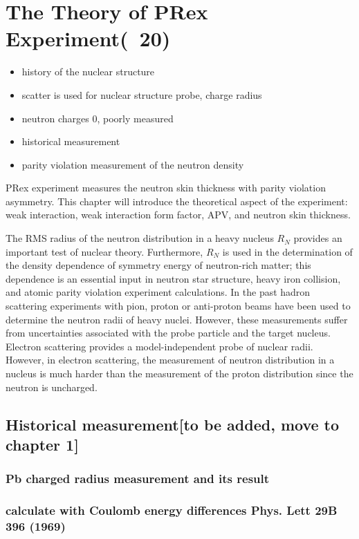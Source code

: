 \chapter{The Theory of PRex Experiment(~20)}

\begin{itemize}
    \item history of the nuclear structure
    \item scatter is used for nuclear structure probe, charge radius 
    \item neutron charges 0, poorly measured
    \item historical measurement 
    \item parity violation measurement of the neutron density
\end{itemize}

PRex experiment measures the neutron skin thickness with parity violation asymmetry. This chapter will introduce the theoretical aspect of the experiment: weak interaction, weak interaction form factor, APV, and neutron skin thickness.

The RMS radius of the  neutron distribution in a heavy nucleus  $R_N$ provides an important test of nuclear theory. Furthermore,   $R_N$ is used in the determination of  the density dependence of symmetry energy of neutron-rich matter; this dependence is an  essential input in   neutron star structure, heavy iron collision, and atomic parity violation experiment calculations. In the past hadron scattering experiments with pion, proton or anti-proton beams have been used to determine the neutron radii of heavy nuclei. However, these measurements suffer from uncertainties associated with the probe particle and the target nucleus. Electron scattering provides a model-independent probe of nuclear radii.  However, in electron scattering, the measurement of neutron distribution in a nucleus  is much harder than the measurement of the proton distribution  since the neutron is uncharged. 


\section{Historical measurement[to be added, move to chapter 1]}
\subsection{Pb charged radius measurement and its result }
\subsection{calculate with Coulomb energy differences Phys. Lett 29B 396 (1969)}
